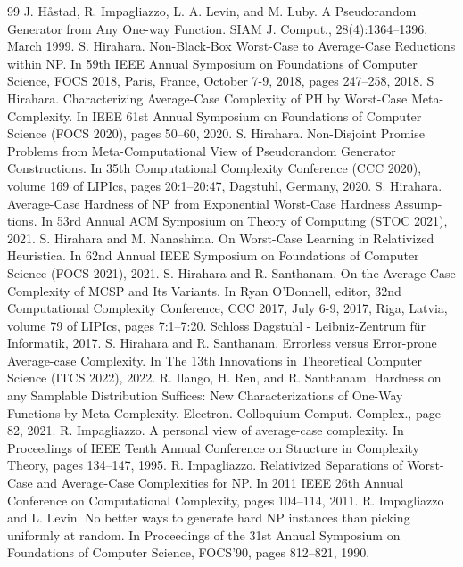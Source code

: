 \documentclass[10pt,a4paper]{article}
\begin{document}
\begin{thebibliography}{99}
 J. Håstad, R. Impagliazzo, L. A. Levin, and M. Luby. A Pseudorandom Generator from Any One-way Function. SIAM J. Comput., 28(4):1364–1396, March 1999.
 S. Hirahara. Non-Black-Box Worst-Case to Average-Case Reductions within NP. In 59th IEEE Annual Symposium on Foundations of Computer Science, FOCS 2018, Paris, France, October 7-9, 2018, pages 247–258, 2018.
 S Hirahara. Characterizing Average-Case Complexity of PH by Worst-Case Meta-Complexity. In IEEE 61st Annual Symposium on Foundations of Computer Science (FOCS 2020), pages 50–60, 2020.
 S. Hirahara. Non-Disjoint Promise Problems from Meta-Computational View of Pseudorandom Generator Constructions. In 35th Computational Complexity Conference (CCC 2020), volume 169 of LIPIcs, pages 20:1–20:47, Dagstuhl, Germany, 2020.
 S. Hirahara. Average-Case Hardness of NP from Exponential Worst-Case Hardness Assump- tions. In 53rd Annual ACM Symposium on Theory of Computing (STOC 2021), 2021.
 S. Hirahara and M. Nanashima. On Worst-Case Learning in Relativized Heuristica. In 62nd Annual IEEE Symposium on Foundations of Computer Science (FOCS 2021), 2021.
 S. Hirahara and R. Santhanam. On the Average-Case Complexity of MCSP and Its Variants. In Ryan O’Donnell, editor, 32nd Computational Complexity Conference, CCC 2017, July 6-9, 2017, Riga, Latvia, volume 79 of LIPIcs, pages 7:1–7:20. Schloss Dagstuhl - Leibniz-Zentrum für Informatik, 2017.
 S. Hirahara and R. Santhanam. Errorless versus Error-prone Average-case Complexity. In The 13th Innovations in Theoretical Computer Science (ITCS 2022), 2022.
 R. Ilango, H. Ren, and R. Santhanam. Hardness on any Samplable Distribution Suffices: New Characterizations of One-Way Functions by Meta-Complexity. Electron. Colloquium Comput. Complex., page 82, 2021.
 R. Impagliazzo. A personal view of average-case complexity. In Proceedings of IEEE Tenth Annual Conference on Structure in Complexity Theory, pages 134–147, 1995.
 R. Impagliazzo. Relativized Separations of Worst-Case and Average-Case Complexities for NP. In 2011 IEEE 26th Annual Conference on Computational Complexity, pages 104–114, 2011.
 R. Impagliazzo and L. Levin. No better ways to generate hard NP instances than picking uniformly at random. In Proceedings of the 31st Annual Symposium on Foundations of Computer Science, FOCS’90, pages 812–821, 1990.

\end{thebibliography}
\end{document}

